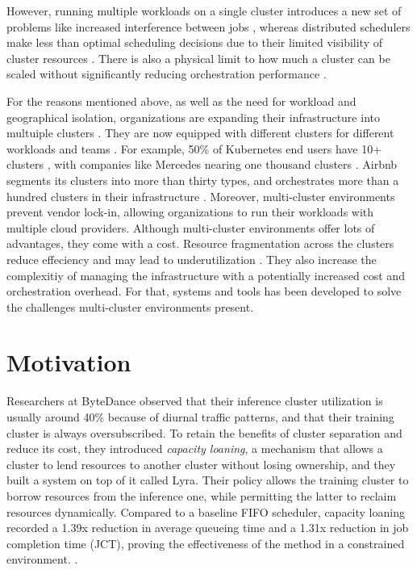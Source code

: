 However, running multiple workloads on a single cluster introduces a new set of
problems like increased interference between jobs \cite{garg_workload_2017},
whereas distributed schedulers make less than optimal scheduling decisions due
to their limited visibility of cluster resources \cite{karanasos_mercury_2015,
delgado_hawk_2015}. There is also a physical limit to how much a cluster can be
scaled without significantly reducing orchestration performance
\cite{noauthor_considerations_nodate}. 

For the reasons mentioned above, as well as the need for workload and
geographical isolation, organizations are expanding their infrastructure into
multuiple clusters \cite{noauthor_multi-cluster_nodate}. They are now equipped
with different clusters for different workloads and teams
\cite{patel_what_2022, li_lyra_2023}. For example, 50\% of Kubernetes end users
have 10+ clusters \cite{noauthor_cncf_2023, verma_large-scale_2015}, with
companies like Mercedes nearing one thousand clusters
\cite{noauthor_mercedes-benz_2023}. Airbnb segments its clusters into more than
thirty types, and orchestrates more than a hundred clusters in their
infrastructure \cite{noauthor_dynamic_nodate-1}. Moreover, multi-cluster
environments prevent vendor lock-in, allowing organizations to run their
workloads with multiple cloud providers. Although multi-cluster environments
offer lots of advantages, they come with a cost. Resource fragmentation across
the clusters reduce effeciency and may lead to underutilization
\cite{noauthor_kubernetes_nodate}. They also increase the complexitiy of
managing the infrastructure with a potentially increased cost and orchestration
overhead. For that, systems and tools has been developed to solve the
challenges multi-cluster environments present. 


\section{Motivation}

Researchers at ByteDance observed that their inference cluster utilization is
usually around 40\% because of diurnal traffic patterns, and that their
training cluster is always oversubscribed. To retain the benefits of cluster
separation and reduce its cost, they introduced \textit{capacity loaning}, a
mechanism that allows a cluster to lend resources to another cluster without
losing ownership, and they built a system on top of it called Lyra. Their policy
allows the training cluster to borrow resources from the inference one, while
permitting the latter to reclaim resources dynamically. Compared to a baseline
FIFO scheduler, capacity loaning recorded a 1.39x reduction in average queueing
time and a 1.31x reduction in job completion time (JCT), proving the
effectiveness of the method in a constrained environment. \cite{li_lyra_2023}.

